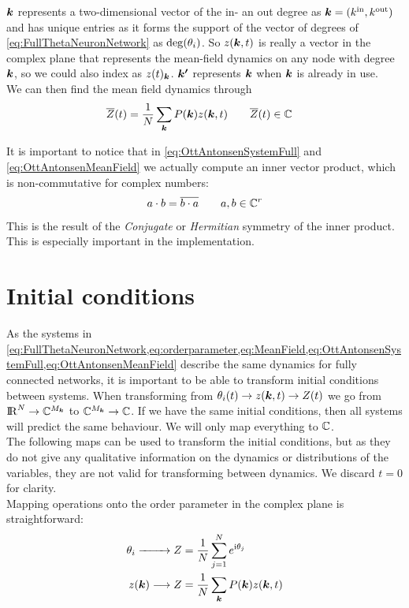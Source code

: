 ${\boldsymbol{k}}$ represents a two-dimensional vector of the in- an out degree as ${\boldsymbol{k}} = ( {k^{\rm in}}, {k^{\rm out}})$ and has unique entries as it forms the support of the vector of degrees of \eqref{eq:FullThetaNeuronNetwork} as ${\rm deg}(\theta_i)$. So $z({\boldsymbol{k}},t)$ is really a vector in the complex plane that represents the mean-field dynamics on any node with degree ${\boldsymbol{k}}$, so we could also index as $z(t)_{{\boldsymbol{k}}}$. ${\boldsymbol{k'}}$ represents ${\boldsymbol{k}}$ when ${\boldsymbol{k}}$ is already in use.\\

We can then find the mean field dynamics through
\begin{align}
\overline{Z}(t) &= \frac{1}{N} \sum_{{\boldsymbol{k}}} P({\boldsymbol{k}}) z({\boldsymbol{k}}, t) \qquad \overline{Z}(t) \in {\mathbb{C}} \label{eq:OttAntonsenMeanField}
\end{align}

It is important to notice that in \eqref{eq:OttAntonsenSystemFull} and \eqref{eq:OttAntonsenMeanField} we actually compute an inner vector product, which is non-commutative for complex numbers:
\begin{align}
a \cdot b = \overline{b \cdot a} \qquad a, b \in {\mathbb{C}}^r
\end{align}
This is the result of the \textsl{Conjugate} or \textsl{Hermitian} symmetry of the inner product. This is especially important in the \matlab implementation.


\section{Initial conditions}
As the systems in \cref{eq:FullThetaNeuronNetwork,eq:orderparameter,eq:MeanField,eq:OttAntonsenSystemFull,eq:OttAntonsenMeanField} describe the same dynamics for fully connected networks, it is important to be able to transform initial conditions between systems. When transforming from $\theta_i(t) \rightarrow z({\boldsymbol{k}},t) \rightarrow Z(t)$ we go from ${\rm I\!R}^N \rightarrow {\mathbb{C}}^{M_{\boldsymbol{k}}}$ to ${\mathbb{C}}^{M_{\boldsymbol{k}}} \rightarrow {\mathbb{C}}$. If we have the same initial conditions, then all systems will predict the same behaviour. We will only map everything to ${\mathbb{C}}$.\\
The following maps can be used to transform the initial conditions, but as they do not give any qualitative information on the dynamics or distributions of the variables, they are not valid for transforming between dynamics. We discard $t=0$ for clarity. \\
Mapping operations onto the order parameter in the complex plane is straightforward:
\begin{align*}
\theta_i \xrightarrow{\hspace*{8mm}} Z &= \frac{1}{N} \sum_{j=1}^N e^{{\rm{i}}\theta_j} \\
z({\boldsymbol{k}}) \longrightarrow Z &= \frac{1}{N} \sum_{{\boldsymbol{k}}} P({\boldsymbol{k}}) z({\boldsymbol{k}}, t)
\end{align*}


